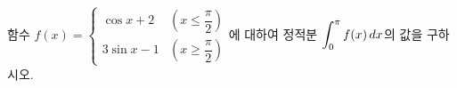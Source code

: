 함수 $f(x)=\begin{cases} \cos x+2 & \left(x\le\dfrac{\pi}{2}\right) \\[1mm] 3\sin x-1 & \left(x\ge\dfrac{\pi}{2}\right) \end{cases}$에 대하여 정적분 $\displaystyle\int_{0}^{\pi}f(x)\mkern3mu dx$의 값을 구하시오.
